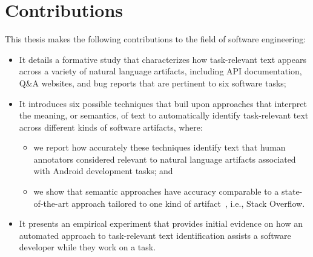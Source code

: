 

\section{Contributions}
\label{cp1:contributions}

This thesis makes the following contributions to the field of software engineering:




\begin{itemize}

    \item It details a formative study that characterizes how task-relevant text appears across a variety of natural language artifacts, including  API documentation, Q\&A websites, and
    bug reports that are pertinent to six software tasks; 

    \item It introduces six possible techniques that buil upon approaches that interpret the meaning, or semantics, of text
    to automatically identify task-relevant text across different kinds of software artifacts, where:

    \begin{itemize}
        
        \item we report how accurately these techniques identify text that human annotators considered relevant to natural language artifacts associated with Android development tasks; and

        \item we show that semantic approaches have accuracy comparable to a state-of-the-art approach
        tailored to one kind of artifact~\cite{Xu2017}, i.e., Stack Overflow.
    \end{itemize}



    \item It presents an empirical experiment that provides initial evidence on how  
    an automated approach to task-relevant text identification assists a software developer while they work on a task.
\end{itemize}











